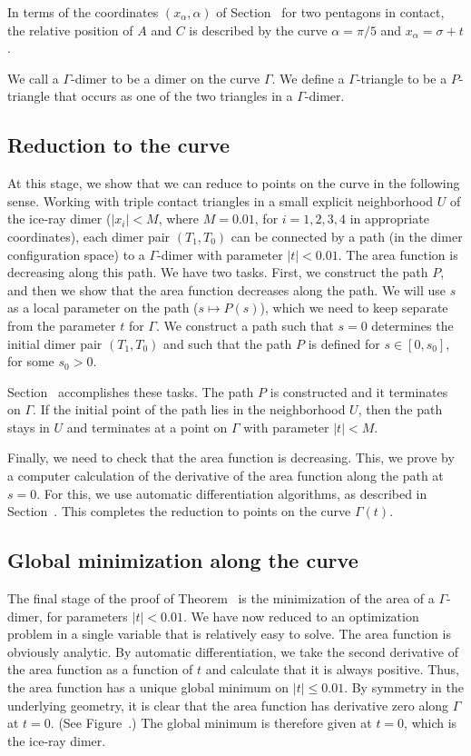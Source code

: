 In terms of the coordinates $(x_\alpha,\alpha)$ of
Section~ for two pentagons in contact, the relative
position of $A$ and $C$ is described by the curve $\alpha=\pi/5$ and
$x_\alpha = \sigma+t$.

We call a $\Gamma$-dimer to be a dimer on the curve $\Gamma$.  We
define a $\Gamma$-triangle to be a $P$-triangle that occurs as one of
the two triangles in a $\Gamma$-dimer.


\subsection{Reduction to the curve}

At this stage, we show that we can reduce to points on the curve in
the following sense.  Working with triple contact triangles in a small
explicit neighborhood $U$ of the ice-ray dimer ($|x_i|<M$, where
$M=0.01$, for $i=1,2,3,4$ in appropriate coordinates), each dimer pair
$(T_1,T_0)$ can be connected by a path (in the dimer configuration
space) to a $\Gamma$-dimer with parameter $|t|<0.01$.  The area
function is decreasing along this path.  We have two tasks.  First, we
construct the path $P$, and then we show that the area function
decreases along the path.  We will use $s$ as a local parameter on the
path ($s\mapsto P(s)$), which we need to keep separate from the
parameter $t$ for $\Gamma$.  We construct a path such that $s=0$
determines the initial dimer pair $(T_1,T_0)$ and such that the path
$P$ is defined for $s\in [0,s_0]$, for some $s_0>0$.

Section~ accomplishes these tasks.  The path $P$ is
constructed and it terminates on $\Gamma$.  If the initial point of
the path lies in the neighborhood $U$, then the path stays in $U$
and terminates at a point on $\Gamma$ with parameter $|t|<M$.

Finally, we need to check that the area function is decreasing. This,
we prove by a computer calculation of the derivative of the area
function along the path at $s=0$.  For this, we use automatic
differentiation algorithms, as described in
Section~.  This completes the reduction to points
on the curve $\Gamma(t)$.

\subsection{Global minimization along the curve}

The final stage of the proof of Theorem~ is the
minimization of the area of a $\Gamma$-dimer, for parameters
$|t|<0.01$.  We have now reduced to an optimization problem in a
single variable that is relatively easy to solve.  The area function
is obviously analytic.  By automatic differentiation, we take the
second derivative of the area function as a function of $t$ and
calculate that it is always positive.  Thus, the area function has a
unique global minimum on $|t|\le 0.01$.  By symmetry in the underlying
geometry, it is clear that the area function has derivative zero along
$\Gamma$ at $t=0$.  (See Figure~.) The global
minimum is therefore given at $t=0$, which is the ice-ray dimer.

